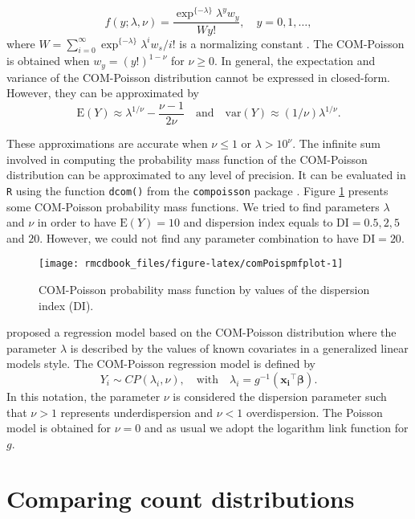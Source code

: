 \documentclass[9pt,a5paper,]{book}
\theoremstyle{definition}
\theoremstyle{definition}
\theoremstyle{remark}
\begin{document}
\[
f(y; \lambda, \nu) = \frac{\exp^{\{-\lambda\}} \lambda^y w_y}{W y!}, \quad y = 0, 1, \ldots,
\] where
\(W = \sum_{i = 0}^{\infty} \exp^{\{-\lambda\}} \lambda^i w_s / i!\) is
a normalizing constant \citep{Sellers2012}. The COM-Poisson is obtained
when \(w_{y} = (y!)^{1-\nu}\) for \(\nu \geq 0\). In general, the
expectation and variance of the COM-Poisson distribution cannot be
expressed in closed-form. However, they can be approximated by
\[\mathrm{E}(Y) \approx \lambda^{1/\nu} - \frac{\nu - 1}{2 \nu} \quad
\text{and} \quad \mathrm{var}(Y) \approx (1/ \nu) \lambda^{1 /\nu}.\]

These approximations are accurate when \(\nu \leq 1\) or
\(\lambda > 10^{\nu}\). The infinite sum involved in computing the
probability mass function of the COM-Poisson distribution can be
approximated to any level of precision. It can be evaluated in
\texttt{R} using the function \texttt{dcom()} from the
\texttt{compoisson} package \citep{Dunn2012}. Figure
\ref{fig:comPoispmfplot} presents some COM-Poisson probability mass
functions. We tried to find parameters \(\lambda\) and \(\nu\) in order
to have \(\mathrm{E}(Y) = 10\) and dispersion index equals to
\(\mathrm{DI} = 0.5, 2, 5\) and \(20\). However, we could not find any
parameter combination to have \(\mathrm{DI} = 20\).

\begin{figure}[h]

{\centering \texttt{[image: rmcdbook\_files/figure-latex/comPoispmfplot-1]} 

}

\caption{COM-Poisson probability mass function by values of the dispersion index (DI).}\label{fig:comPoispmfplot}
\end{figure}

\citet{Sellers2010} proposed a regression model based on the COM-Poisson
distribution where the parameter \(\lambda\) is described by the values
of known covariates in a generalized linear models style. The
COM-Poisson regression model is defined by
\[Y_i \sim CP(\lambda_i, \nu), \quad  \text{with} \quad \lambda_i = g^{-1}(\boldsymbol{x_i}^{\top} \boldsymbol{\beta}).\]
In this notation, the parameter \(\nu\) is considered the dispersion
parameter such that \(\nu > 1\) represents underdispersion and
\(\nu < 1\) overdispersion. The Poisson model is obtained for
\(\nu = 0\) and as usual we adopt the logarithm link function for \(g\).

\section{Comparing count
distributions}\label{comparing-count-distributions}
\end{document}
